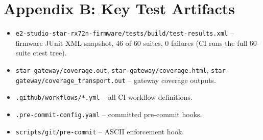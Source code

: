 \documentclass[11pt,letterpaper]{article}
\begin{document}
\section*{Appendix B: Key Test Artifacts}

\begin{itemize}[leftmargin=1.4em,itemsep=2pt]
\item \texttt{e2-studio-star-rx72n-firmware/tests/build/test-results.xml}
      -- firmware JUnit XML snapshot, 46 of 60 suites, 0 failures
      (CI runs the full 60-suite ctest tree).
\item \texttt{star-gateway/coverage.out},
      \texttt{star-gateway/coverage.html},
      \texttt{star-gateway/coverage\_transport.out}
      -- gateway coverage outputs.
\item \texttt{.github/workflows/*.yml}
      -- all CI workflow definitions.
\item \texttt{.pre-commit-config.yaml}
      -- committed pre-commit hooks.
\item \texttt{scripts/git/pre-commit}
      -- ASCII enforcement hook.
\end{itemize}
\end{document}
